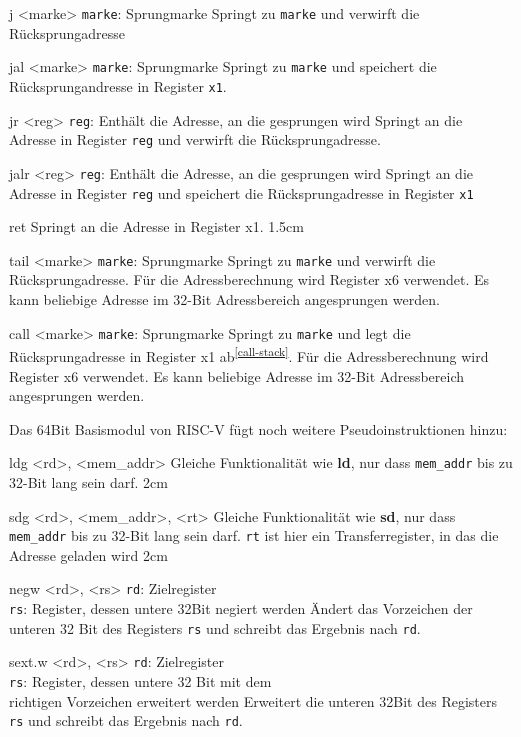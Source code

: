 \pseudoinst
{
  j <marke>
}
{
  \texttt{marke}: Sprungmarke
}
{
  Springt zu \texttt{marke} und verwirft die Rücksprungadresse
}

\pseudoinst
{
  jal <marke>
}
{
  \texttt{marke}: Sprungmarke
}
{
  Springt zu \texttt{marke} und speichert die Rücksprungandresse in Register \texttt{x1}.
}

\pseudoinst
{
  jr <reg>
}
{
  \texttt{reg}: Enthält die Adresse, an die gesprungen wird
}
{
  Springt an die Adresse in Register \texttt{reg} und verwirft die Rücksprungadresse.
}

\pseudoinst
{
  jalr <reg>
}
{
  \texttt{reg}: Enthält die Adresse, an die gesprungen wird
}
{
  Springt an die Adresse in Register \texttt{reg} und speichert die
  Rücksprungadresse in Register \texttt{x1}
}

\pseudoinsttwo
{
  ret
}
{
  Springt an die Adresse in Register x1.\footnotemark
}
{1.5cm}

\pseudoinst
{
  tail <marke>
}
{
  \texttt{marke}: Sprungmarke
}
{
  Springt zu \texttt{marke} und verwirft die Rücksprungadresse. Für die Adressberechnung wird Register x6 verwendet. Es kann beliebige Adresse im 32-Bit Adressbereich angesprungen werden.
}

\pseudoinst
{
  call <marke>
}
{
  \texttt{marke}: Sprungmarke
}
{
  Springt zu \texttt{marke} und legt die Rücksprungadresse in Register x1 ab\textsuperscript{\ref{call-stack}}.  Für die Adressberechnung wird Register x6 verwendet. Es kann beliebige Adresse im 32-Bit Adressbereich angesprungen werden.
}


\pagebreak
Das 64Bit Basismodul von RISC-V fügt noch weitere Pseudoinstruktionen hinzu:\\
\vspace{0.5cm}


\pseudoinsttwo
{
  ldg <rd>, <mem\_addr>
}
{
  Gleiche Funktionalität wie \textbf{ld}, nur dass \texttt{mem\_addr} bis zu 32-Bit lang sein darf.
}
{2cm}

\pseudoinsttwo
{
  sdg <rd>, <mem\_addr>, <rt>
}
{
  Gleiche Funktionalität wie \textbf{sd}, nur dass \texttt{mem\_addr} bis zu 32-Bit lang sein darf. \texttt{rt} ist hier ein Transferregister, in das die Adresse geladen wird
}
{2cm}

\pseudoinst
{
  negw <rd>, <rs>
}
{
  \texttt{rd}: Zielregister \\
  \texttt{rs}: Register, dessen untere 32Bit negiert werden
}
{
  Ändert das Vorzeichen der unteren 32 Bit des Registers \texttt{rs} und schreibt das Ergebnis nach \texttt{rd}.
}

\pseudoinst
{
  sext.w <rd>, <rs>
}
{
  \texttt{rd}: Zielregister \\
  \texttt{rs}: Register, dessen untere 32 Bit mit dem\\ richtigen Vorzeichen erweitert werden
}
{
  Erweitert die unteren 32Bit des Registers \texttt{rs} und schreibt das Ergebnis nach \texttt{rd}.
}
